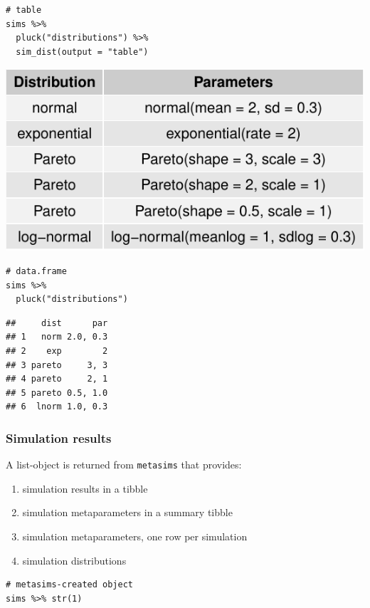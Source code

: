 \documentclass[
]{article}
\providecommand{\tightlist}{%
  \setlength{\itemsep}{0pt}\setlength{\parskip}{0pt}}
\begin{document}
\begin{verbatim}
# table
sims %>% 
  pluck("distributions") %>% 
  sim_dist(output = "table")
\end{verbatim}

\includegraphics{simeta-demo_files/figure-latex/unnamed-chunk-3-2.pdf}

\begin{verbatim}
# data.frame
sims %>% 
  pluck("distributions")
\end{verbatim}

\begin{verbatim}
##     dist      par
## 1   norm 2.0, 0.3
## 2    exp        2
## 3 pareto     3, 3
## 4 pareto     2, 1
## 5 pareto 0.5, 1.0
## 6  lnorm 1.0, 0.3
\end{verbatim}

\hypertarget{simulation-results}{%
\subsubsection{Simulation results}\label{simulation-results}}

A list-object is returned from \texttt{metasims} that provides:

\begin{enumerate}
\def\labelenumi{\arabic{enumi}.}
\tightlist
\item
  simulation results in a tibble
\item
  simulation metaparameters in a summary tibble
\item
  simulation metaparameters, one row per simulation
\item
  simulation distributions
\end{enumerate}

\begin{verbatim}
# metasims-created object
sims %>% str(1)
\end{verbatim}
\end{document}
